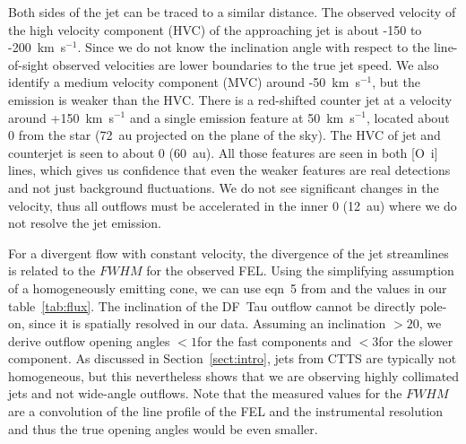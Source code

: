 \documentclass[twocolumn,trackchanges]{aastex63}
\begin{document}
Both sides of the jet can be traced to a similar distance. The observed
velocity of the high velocity component (HVC) of the approaching jet is about -150 to
-200~km~s$^{-1}$. Since we do not know the inclination angle with respect to
the line-of-sight observed velocities are lower boundaries to the true jet
speed. We also identify a medium velocity component (MVC) around -50~km~s$^{-1}$, but the emission is
weaker than the HVC. There is a red-shifted counter jet at a velocity around
+150~km~s$^{-1}$ and a single emission feature at 50~km~s$^{-1}$, located about
0 from the star (72~au projected on the plane of the sky). The HVC of
jet and counterjet is seen to about 0 (60~au). All those features are
seen in both [O~{\sc i}] lines, which gives us confidence that even the weaker
features are real detections and not just background fluctuations. We do not
see significant changes in the velocity, thus all outflows must be accelerated
in the inner 0 (12~au) where we do not resolve the jet emission.

For a divergent flow with constant velocity, the divergence of the jet
  streamlines is related to the $FWHM$ for the observed FEL. Using the
  simplifying assumption of a homogeneously emitting cone, we can use eqn~5
  from \citet{1990A&A...232...37M} and the values in our
  table~\ref{tab:flux}. 
 The inclination of the DF~Tau outflow cannot be
  directly pole-on, since it is spatially resolved in our data. Assuming an
  inclination $>20$\degr, we derive outflow opening angles $<1$\degr for the
  fast components and $<3$\degr for the slower component. As discussed in
  Section~\ref{sect:intro}, jets from CTTS are typically not homogeneous, but
  this nevertheless shows that we are observing highly collimated jets and not
  wide-angle outflows. Note that the measured values for the $FWHM$ are a
  convolution of the line profile of the FEL and the instrumental resolution
  and thus the true opening angles would be even smaller.
\end{document}
